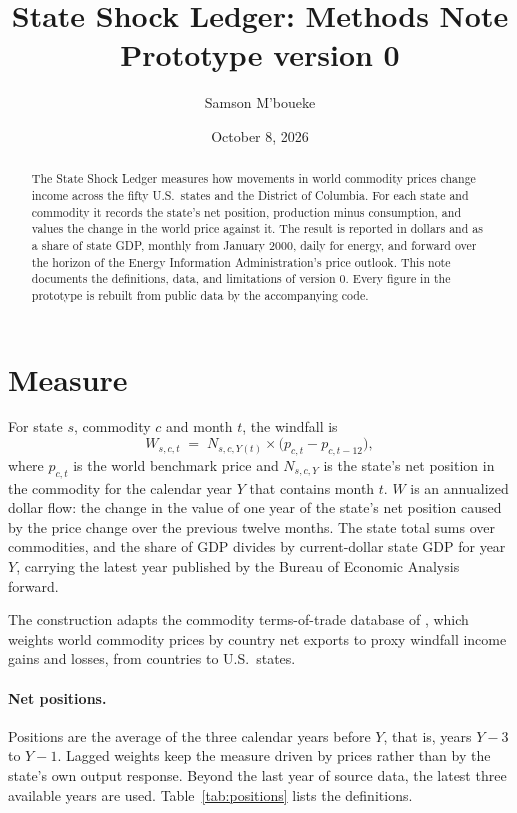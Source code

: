 \documentclass[11pt]{article}
\title{\textbf{State Shock Ledger: Methods Note}\\[0.3em]\large Prototype version 0}
\author{Samson M'boueke}
\date{October 8, 2026}
\begin{document}
\maketitle

\begin{abstract}
\noindent The State Shock Ledger measures how movements in world commodity prices change
income across the fifty U.S.\ states and the District of Columbia. For each state and
commodity it records the state's net position, production minus consumption, and values
the change in the world price against it. The result is reported in dollars and as a share
of state GDP, monthly from January 2000, daily for energy, and forward over the horizon of
the Energy Information Administration's price outlook. This note documents the definitions,
data, and limitations of version 0. Every figure in the prototype is rebuilt from public
data by the accompanying code.
\end{abstract}

\section{Measure}

For state $s$, commodity $c$ and month $t$, the windfall is
\begin{equation}
  W_{s,c,t} \;=\; N_{s,c,Y(t)} \times \bigl(p_{c,t} - p_{c,t-12}\bigr),
  \label{eq:windfall}
\end{equation}
where $p_{c,t}$ is the world benchmark price and $N_{s,c,Y}$ is the state's net position in
the commodity for the calendar year $Y$ that contains month $t$. $W$ is an annualized dollar
flow: the change in the value of one year of the state's net position caused by the price
change over the previous twelve months. The state total sums over commodities, and the
share of GDP divides by current-dollar state GDP for year $Y$, carrying the latest year
published by the Bureau of Economic Analysis forward.

The construction adapts the commodity terms-of-trade database of \citet{gruss2019}, which
weights world commodity prices by country net exports to proxy windfall income gains and
losses, from countries to U.S.\ states.

\paragraph{Net positions.} Positions are the average of the three calendar years before
$Y$, that is, years $Y-3$ to $Y-1$. Lagged weights keep the measure driven by prices rather
than by the state's own output response. Beyond the last year of source data, the latest
three available years are used. Table~\ref{tab:positions} lists the definitions.
\end{document}
